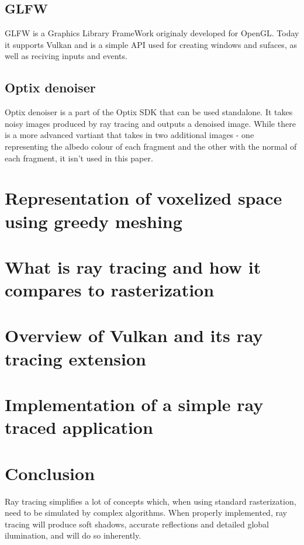 \documentclass[times, utf8, zavrsni]{fer}
\begin{document}
\section{GLFW}
GLFW is a Graphics Library FrameWork originaly developed for OpenGL. Today it supports Vulkan and is a simple API used for creating windows and sufaces, as well as reciving inputs and events.

\section{Optix denoiser}
Optix denoiser is a part of the Optix SDK that can be used standalone. It takes noisy images produced by ray tracing and outputs a denoised image. While there is a more advanced vartiant that takes in two additional images - one representing the albedo colour of each fragment and the other with the normal of each fragment, it isn't used in this paper.

\chapter{Representation of voxelized space using greedy meshing}
\chapter{What is ray tracing and how it compares to rasterization}
\chapter{Overview of Vulkan and its ray tracing extension}
\chapter{Implementation of a simple ray traced application}

\chapter{Conclusion}
Ray tracing simplifies a lot of concepts which, when using standard rasterization, need to be simulated by complex algorithms. When properly implemented, ray tracing will produce soft shadows, accurate reflections and detailed global ilumination, and will do so inherently.
\end{document}
